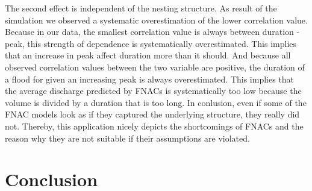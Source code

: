 \documentclass[
]{krantz}
\begin{document}
The second effect is independent of the nesting structure. As result of the simulation we observed a systematic
overestimation of the lower correlation value. Because in our data, the smallest correlation
value is always between duration - peak, this strength of dependence is systematically overestimated.
This implies that an increase in peak affect duration more than it should. And because
all observed correlation values between the two variable are positive, the duration of a flood
for given an increasing peak is always overestimated. This implies that the average discharge predicted by
FNACs is systematically too low because the volume is divided by a duration that is too long. In conlusion,
even if some of the FNAC models look as if they captured the underlying structure, they really did not.
Thereby, this application
nicely depicts the shortcomings of FNACs and the reason why they are
not suitable if their assumptions are violated.

\section{Conclusion}\label{conclusion}
\end{document}
